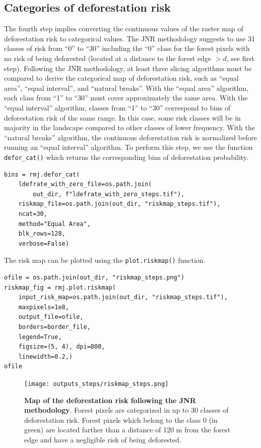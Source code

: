 \documentclass[paper=a4, 12pt, DIV=12]{scrartcl}
\begin{document}
\subsection{Categories of deforestation risk}
\label{sec:orgfbd54c7}

The fourth step implies converting the continuous values of the raster map of deforestation risk to categorical values. The JNR methodology suggests to use 31 classes of risk from ``0'' to ``30'' including the ``0'' class for the forest pixels with no risk of being deforested (located at a distance to the forest edge \(> d\), see first step). Following the JNR methodology, at least three slicing algorithms must be compared to derive the categorical map of deforestation risk, such as ``equal area'', ``equal interval'', and ``natural breaks''. With the ``equal area'' algorithm, each class from ``1'' to ``30'' must cover approximately the same area. With the ``equal interval'' algorithm, classes from ``1'' to ``30'' correspond to bins of deforestation risk of the same range. In this case, some risk classes will be in majority in the landscape compared to other classes of lower frequency. With the ``natural breaks'' algorithm, the continuous deforestation risk is normalized before running an ``equal interval'' algorithm. To perform this step, we use the function \texttt{defor\_cat()} which returns the corresponding bins of deforestation probability.

\begin{verbatim}
bins = rmj.defor_cat(
    ldefrate_with_zero_file=os.path.join(
        out_dir, f"ldefrate_with_zero_steps.tif"),
    riskmap_file=os.path.join(out_dir, "riskmap_steps.tif"),
    ncat=30,
    method="Equal Area",
    blk_rows=128,
    verbose=False)
\end{verbatim}

The risk map can be plotted using the \texttt{plot.riskmap()} function.

\begin{verbatim}
ofile = os.path.join(out_dir, "riskmap_steps.png")
riskmap_fig = rmj.plot.riskmap(
    input_risk_map=os.path.join(out_dir, "riskmap_steps.tif"),
    maxpixels=1e8,
    output_file=ofile,
    borders=border_file,
    legend=True,
    figsize=(5, 4), dpi=800,
    linewidth=0.2,)
ofile
\end{verbatim}

\begin{figure}[H]
\centering
\texttt{[image: outputs\_steps/riskmap\_steps.png]}
\caption{\label{fig:org12f25e0}\textbf{Map of the deforestation risk following the JNR methodology}. Forest pixels are categorized in up to 30 classes of deforestation risk. Forest pixels which belong to the class 0 (in green) are located farther than a distance of 120 m from the forest edge and have a negligible risk of being deforested.}
\end{figure}
\end{document}
